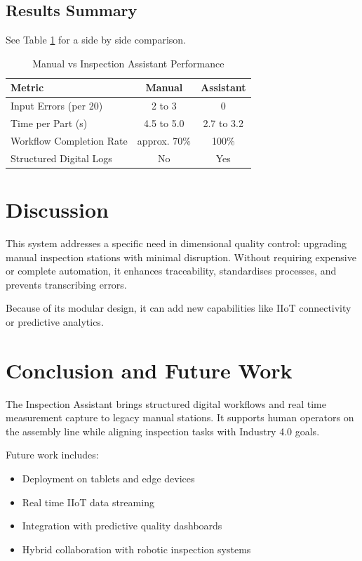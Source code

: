 \documentclass[conference]{IEEEtran}
\begin{document}
\subsection{Results Summary}
See Table \ref{tab:comparison} for a side by side comparison.

\begin{table}[htbp]
\centering
\caption{Manual vs Inspection Assistant Performance}
\begin{tabular}{lcc}
\toprule
\textbf{Metric} & \textbf{Manual} & \textbf{Assistant} \\
\midrule
Input Errors (per 20) & 2 to 3 & 0 \\
Time per Part (s) & 4.5 to 5.0 & 2.7 to 3.2 \\
Workflow Completion Rate & approx. 70\% & 100\% \\
Structured Digital Logs & No & Yes \\
\bottomrule
\end{tabular}
\label{tab:comparison}
\end{table}

\section{Discussion}
This system addresses a specific need in dimensional quality control: upgrading manual inspection stations with minimal disruption.  Without requiring expensive or complete automation, it enhances traceability, standardises processes, and prevents transcribing errors.

Because of its modular design, it can add new capabilities like IIoT connectivity or predictive analytics.
\section{Conclusion and Future Work}
The Inspection Assistant brings structured digital workflows and real time measurement capture to legacy manual stations. It supports human operators on the assembly line while aligning inspection tasks with Industry 4.0 goals.

Future work includes:
\begin{itemize}
\item Deployment on tablets and edge devices
\item Real time IIoT data streaming
\item Integration with predictive quality dashboards
\item Hybrid collaboration with robotic inspection systems
\end{itemize}
\end{document}
